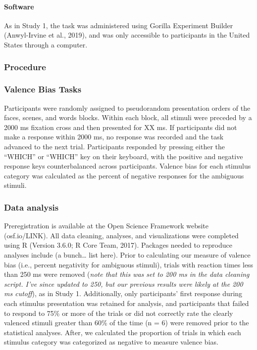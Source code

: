 \documentclass[man]{apa6}
\let\oldparagraph\paragraph
\renewcommand{\paragraph}[1]{\oldparagraph{#1}\mbox{}}
\begin{document}
\hypertarget{software-1}{%
\paragraph{Software}\label{software-1}}

As in Study 1, the task was administered using Gorilla Experiment Builder (Anwyl-Irvine et al., 2019), and was only accessible to participants in the United States through a computer.

\hypertarget{procedure}{%
\subsubsection{Procedure}\label{procedure}}

\hypertarget{valence-bias-tasks}{%
\subsubsection{Valence Bias Tasks}\label{valence-bias-tasks}}

Participants were randomly assigned to pseudorandom presentation orders of the faces, scenes, and words blocks. Within each block, all stimuli were preceded by a 2000 ms fixation cross and then presented for XX ms. If participants did not make a response within 2000 ms, no response was recorded and the task advanced to the next trial. Participants responded by pressing either the \enquote{WHICH} or \enquote{WHICH} key on their keyboard, with the positive and negative response keys counterbalanced across participants. Valence bias for each stimulus category was calculated as the percent of negative responses for the ambiguous stimuli.

\hypertarget{data-analysis}{%
\subsubsection{Data analysis}\label{data-analysis}}

Preregistration is available at the Open Science Framework website (osf.io/LINK). All data cleaning, analyses, and visualizations were completed using R (Version 3.6.0; R Core Team, 2017). Packages needed to reproduce analyses include (a bunch\ldots{} list here). Prior to calculating our measure of valence bias (i.e., percent negativity for ambiguous stimuli), trials with reaction times less than 250 ms were removed (\emph{note that this was set to 200 ms in the data cleaning script. I've since updated to 250, but our previous results were likely at the 200 ms cutoff}), as in Study 1. Additionally, only participants' first response during each stimulus presentation was retained for analysis, and participants that failed to respond to 75\% or more of the trials or did not correctly rate the clearly valenced stimuli greater than 60\% of the time (n = 6) were removed prior to the statistical analyses. After, we calculated the proportion of trials in which each stimulus category was categorized as negative to measure valence bias.
\end{document}
